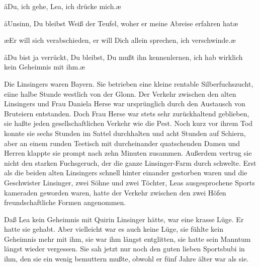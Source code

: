 \aa Du, ich gehe, Lea, ich drücke mich.\ae

\aa Unsinn, Du bleibst\ausr{} Weiß der Teufel, woher er meine Abreise
erfahren hat\ausr\ae

\ae Er will sich verabschieden, er will Dich allein sprechen, ich
verschwinde.\ae

\aa Du bist ja verrückt, Du bleibst, Du mußt ihn kennenlernen,
ich hab wirklich kein Geheimnis mit ihm.\ae

Die Linsingers waren Bayern. Sie betrieben eine kleine
rentable Silberfuchszucht, eiine halbe Stunde westlich von
der Glonn. Der Verkehr zwischen den alten Linsingers und
Frau Daniela Herse war ursprünglich durch den Austausch
von Bruteiern entstanden. Doch Frau Herse war stets sehr
zurückhaltend geblieben, sie haßte jeden gesellschaftlichen
Verkehr wie die Pest. Noch kurz vor ihrem Tod konnte sie
sechs Stunden im Sattel durchhalten und acht Stunden auf
Schiern, aber an einem runden Teetisch mit durcheinander\-%
quatschenden Damen und Herren klappte sie prompt nach
zehn Minuten zusammen. Außerdem vertrug sie nicht den
starken Fuchsgeruch, der die ganze Linsinger-Farm durch\-%
schwelte. Erst als die beiden alten Linsingers schnell hinter\-%
einander gestorben waren und die Geschwister Linsinger,
zwei Söhne und zwei Töchter, Leas ausgesprochene Sports\-%
kameraden geworden waren, hatte der Verkehr zwischen den
zwei Höfen freundschaftliche Formen angenommen.

Daß Lea kein Geheimnis mit Quirin Linsinger hätte, war eine
krasse Lüge. Er hatte sie gehabt. Aber vielleicht war es auch
keine Lüge, sie fühlte kein Geheimnis mehr mit ihm, sie war
ihm längst entglitten, sie hatte sein Manntum längst wieder
vergessen. Sie sah jetzt nur noch den guten lieben Sportsbubi
in ihm, den sie ein wenig bemuttern mußte, obwohl er fünf
Jahre älter war als sie.

